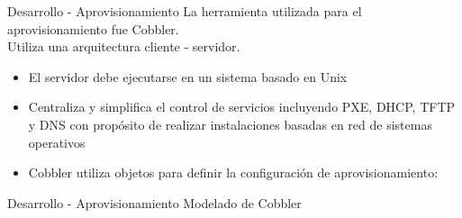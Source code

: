 
\begin{frame}{Desarrollo - Aprovisionamiento}
    \vspace{-1.5cm}
    La herramienta utilizada para el aprovisionamiento fue Cobbler.
    \\
    Utiliza una arquitectura cliente - servidor.
    \begin{itemize}
        \item El servidor debe ejecutarse en un sistema basado en Unix
        \item Centraliza y simplifica el control de servicios incluyendo PXE, DHCP, TFTP y DNS con propósito de realizar instalaciones basadas en red de sistemas operativos
        \item Cobbler utiliza objetos para definir la configuración de aprovisionamiento:
    \end{itemize}
    
\end{frame}

\begin{frame}{Desarrollo - Aprovisionamiento}
    \vspace{0cm} {Modelado de Cobbler}
    \vspace{0.5cm}
    \begin{figure}[ht]
       \centering
       \vspace{-0.50cm}
    \end{figure}
\end{frame}

